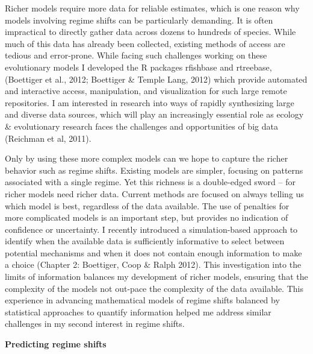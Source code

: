 Richer models require more data for reliable estimates, which is one reason why models involving regime shifts can be particularly demanding.  It is often impractical to directly gather data across dozens to hundreds of species.  While much of this data has already been collected, existing methods of access are tedious and error-prone.  While facing such challenges working on these evolutionary models I developed the R packages rfishbase and rtreebase, (Boettiger et al., 2012; Boettiger \& Temple Lang, 2012) which provide automated and interactive access, manipulation, and visualization for such large remote repositories.   I am interested in research into ways of rapidly synthesizing large and diverse data sources, which will play an increasingly essential role as ecology \& evolutionary research faces the challenges and opportunities of big data (Reichman et al, 2011).

Only by using these more complex models can we hope to capture the richer behavior such as regime shifts.  Existing models are simpler, focusing on patterns associated with a single regime.  Yet this richness  is a double-edged sword – for richer models need richer data. Current methods are focused on always telling us which model is best, regardless of the data available.  The use of penalties for more complicated models is an important step, but provides no indication of confidence or uncertainty.  I recently introduced a simulation-based  approach to identify when the available data is sufficiently informative to select between potential mechanisms and when it does not contain enough information to make a choice (Chapter 2: Boettiger, Coop \& Ralph 2012).  This investigation into the limits of information balances my development of richer models, ensuring that the complexity of the models not out-pace the complexity of the data available.  This experience in advancing mathematical models of regime shifts balanced by statistical approaches to quantify information helped me address similar challenges in my second interest in regime shifts.  

\textbf{Predicting regime shifts}

